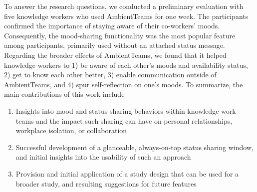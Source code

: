 


\bigskip\noindent To answer the research questions, we conducted a preliminary evaluation with five knowledge workers who used AmbientTeams for one week. The participants confirmed the importance of staying aware of their co-workers' moods. Consequently, the mood-sharing functionality was the most popular feature among participants, primarily used without an attached status message. Regarding the broader effects of AmbientTeams, we found that it helped knowledge workers to 1) be aware of each other's moods and availability status, 2) get to know each other better, 3) enable communication outside of AmbientTeams, and 4) spur self-reflection on one's moods. To summarize, the main contributions of this work include

\begin{enumerate}
    \item Insights into mood and status sharing behaviors within knowledge work teams and the impact such sharing can have on personal relationships, workplace isolation, or collaboration
    \item Successful development of a glanceable, always-on-top status sharing window, and initial insights into the usability of such an approach
    \item Provision and initial application of a study design that can be used for a broader study, and resulting suggestions for future features
\end{enumerate}

